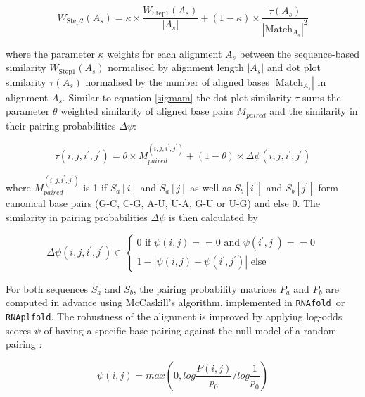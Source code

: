 \documentclass{bmcart}
\begin{document}
\begin{equation}\label{eq7}
	W_{\mbox{Step2}}(A_s) = \kappa \times \frac{W_{\mbox{Step1}}(A_s)}{|A_s|} + (1-\kappa) \times
	\frac{\tau(A_s)}{{|\mbox{Match}_{A_s}|}^2}
\end{equation}

\noindent where the parameter $\kappa$ weights for each alignment $A_s$ between the
sequence-based similarity $W_{\mbox{Step1}}(A_s)$ normalised by alignment
length $|A_s|$ and dot plot similarity $\tau(A_s)$ normalised by the number of
aligned bases $|\mbox{Match}_{A_s}|$ in alignment $A_s$. Similar to equation
\ref{sigmam} the dot plot similarity $\tau$ sums the parameter $\theta$ weighted
similarity of aligned base pairs $M_{paired}$ and the similarity in their
pairing probabilities $\Delta \psi$:

\begin{equation}\label{eq8}
	\tau(i,j,i^\prime,j^\prime) = \theta \times M_{paired}^{(i,j,i^\prime,j^\prime)}
	+ (1-\theta) \times \Delta \psi(i,j,i^\prime,j^\prime)
\end{equation}

\noindent where $M_{paired}^{(i,j,i^\prime,j^\prime)}$ is 1 if $S_a[i]$ and $S_a[j]$ as
well as $S_b[i^\prime]$ and $S_b[j^\prime]$ form canonical base pairs (G-C, C-G,
A-U, U-A, G-U or U-G) and else 0. The similarity in pairing probabilities
$\Delta \psi$ is then calculated by

\begin{equation}\label{eq9}
	\Delta \psi(i,j,i^\prime,j^\prime) \in \left\{ \begin{array}{l}
			0 \textrm{ if }\psi(i,j) == 0 
			  \textrm{ and }\psi(i^\prime,j^\prime) == 0 \\
		1 - | \psi(i,j) - \psi(i^\prime,j^\prime) | \textrm{ else}
		\end{array}\right.
\end{equation}

\noindent For both sequences $S_a$ and $S_b$, the pairing probability matrices $P_a$ and
$P_b$ are computed in advance using McCaskill's algorithm, implemented in
\texttt{RNAfold }or \texttt{RNAplfold}. The robustness of the alignment is improved by applying
log-odds scores $\psi$ of having a specific base pairing against the null model
of a random pairing \cite{Will17432929}:

\begin{equation}\label{eq11}
	\psi(i,j) = max \left( 0, log \frac{P(i,j)}{p_0} / log \frac{1}{p_0} \right)
\end{equation}
\end{document}
